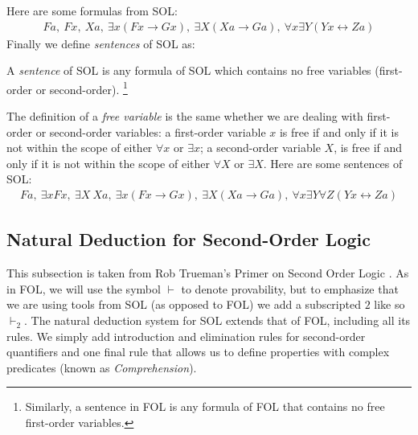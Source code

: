 Here are some formulas from SOL:
\begin{align*}
    Fa, \ Fx, \ Xa, \ \exists x (Fx \rightarrow Gx), \ \exists X (Xa\rightarrow Ga), \ \forall x \exists Y (Yx \leftrightarrow Za)
\end{align*}
Finally we define \textit{sentences} of SOL as:
\begin{definition}
A \textit{sentence} of SOL is any formula of SOL which contains no free variables (first-order or second-order). \footnote{Similarly, a sentence in FOL is any formula of FOL that contains no free first-order variables.}
\end{definition}
The definition of a \textit{free variable} is the same whether we are dealing with first-order or second-order variables: a first-order variable $x$ is free if and only if it is not within the scope of either $\forall x$ or $\exists x$; a second-order variable $X$, is free if and only if it is not within the scope of either $\forall X$ or $\exists X$.
Here are some sentences of SOL:
\begin{align*}
    Fa, \ \exists x Fx, \ \exists X \ Xa , \ \exists x (Fx \rightarrow Gx), \ \exists X (Xa \rightarrow Ga), \ \forall x \exists Y \forall Z (Yx \leftrightarrow Za)
\end{align*}

\subsection{Natural Deduction for Second-Order Logic}
This subsection is taken from Rob Trueman's Primer on Second Order Logic \cite{truemanSOL}. As in FOL, we will use the symbol $\vdash$ to denote provability, but to emphasize that we are using tools from SOL (as opposed to FOL) we add a subscripted $2$ like so $\vdash_2$. The natural deduction system for SOL extends that of FOL, including all its rules. We simply add introduction and elimination rules for second-order quantifiers and one final rule that allows us to define properties with complex predicates (known as \textit{Comprehension}).

